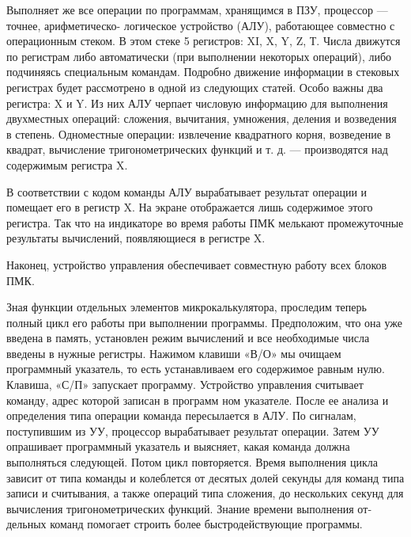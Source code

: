 \documentclass[11pt,a4paper,oneside]{article}
\begin{document}
Выполняет же все операции по программам, хранящимся в ПЗУ, процессор — точнее, арифметическо- логическое устройство (АЛУ), рабо­тающее совместно с операционным стеком. В этом стеке 5 регистров: XI, X, Y, Z, Т. Числа движутся по регистрам либо автоматически (при выполнении некоторых операций), либо подчиняясь специальным коман­дам. Подробно движение информа­ции в стековых регистрах будет рас­смотрено в одной из следующих ста­тей. Особо важны два регистра: X и Y. Из них АЛУ черпает число­вую информацию для выполнения двухместных операций: сложения, вы­читания, умножения, деления и воз­ведения в степень. Одноместные опе­рации: извлечение квадратного кор­ня, возведение в квадрат, вычисле­ние тригонометрических функций и т. д. — производятся над содер­жимым регистра X.

В соответствии с кодом команды АЛУ вырабатывает результат опе­рации и помещает его в регистр X. На экране отображается лишь содер­жимое этого регистра. Так что на индикаторе во время работы ПМК мелькают промежуточные результа­ты вычислений, появляющиеся в ре­гистре X.

Наконец, устройство управления обеспечивает совместную работу всех блоков ПМК.

Зная функции отдельных элемен­тов микрокалькулятора, проследим теперь полный цикл его работы при выполнении программы. Предполо­жим, что она уже введена в память, установлен режим вычислений и все необходимые числа введены в нуж­ные регистры. Нажимом клавиши «В/О» мы очищаем программный ука­затель, то есть устанавливаем его содержимое равным нулю. Клавиша, «С/П» запускает программу. Устрой­ство управления считывает команду, адрес которой записан в программ ном указателе. После ее анализа и определения типа операции команда пересылается в АЛУ. По сигналам, поступившим из УУ, процессор выра­батывает результат операции. Затем УУ опрашивает программный указа­тель и выясняет, какая команда дол­жна выполняться следующей. Потом цикл повторяется. Время выполнения цикла зависит от типа команды и колеблется от десятых долей секун­ды для команд типа записи и считы­вания, а также операций типа сло­жения, до нескольких секунд для вычисления тригонометрических функ­ций. Знание времени выполнения от­дельных команд помогает строить бо­лее быстродействующие программы.
\end{document}
